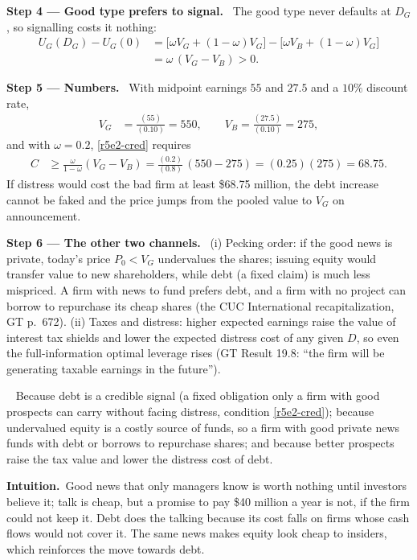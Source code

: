 \documentclass[11pt,a4paper]{article}
\newcommand{\step}[2]{\par\medskip\noindent\textbf{Step #1 --- #2.}~}
\newcommand{\intuition}{\par\medskip\noindent\textbf{Intuition.}~}
\newcommand{\answer}[1]{\par\smallskip\noindent\fbox{\textbf{Answer #1.}}~}
\begin{document}
\step{4}{Good type prefers to signal} The good type never defaults at $D_G$, so signalling costs it nothing:
\begin{align}
  U_G(D_G) - U_G(0) &= \bigl[\omega V_G + (1-\omega)V_G\bigr] - \bigl[\omega V_B + (1-\omega)V_G\bigr] \nonumber\\
  &= \omega\,(V_G - V_B) > 0. \nonumber
\end{align}

\step{5}{Numbers} With midpoint earnings $55$ and $27.5$ and a $10\%$ discount rate,
\begin{align}
  V_G &= \frac{(55)}{(0.10)} = 550, \qquad V_B = \frac{(27.5)}{(0.10)} = 275, \nonumber
\end{align}
and with $\omega=0.2$, \eqref{r5e2-cred} requires
\begin{align}
  C &\ge \frac{\omega}{1-\omega}(V_G-V_B) = \frac{(0.2)}{(0.8)}\,(550-275) = (0.25)(275) = 68.75. \nonumber
\end{align}
If distress would cost the bad firm at least \$68.75 million, the debt increase cannot be faked and the price jumps from the pooled value to $V_G$ on announcement.

\step{6}{The other two channels} (i) Pecking order: if the good news is private, today's price $P_0<V_G$ undervalues the shares; issuing equity would transfer value to new shareholders, while debt (a fixed claim) is much less mispriced. A firm with news to fund prefers debt, and a firm with no project can borrow to repurchase its cheap shares (the CUC International recapitalization, GT p.~672). (ii) Taxes and distress: higher expected earnings raise the value of interest tax shields and lower the expected distress cost of any given $D$, so even the full-information optimal leverage rises (GT Result 19.8: ``the firm will be generating taxable earnings in the future'').

\answer{\unskip} Because debt is a credible signal (a fixed obligation only a firm with good prospects can carry without facing distress, condition \eqref{r5e2-cred}); because undervalued equity is a costly source of funds, so a firm with good private news funds with debt or borrows to repurchase shares; and because better prospects raise the tax value and lower the distress cost of debt.

\intuition Good news that only managers know is worth nothing until investors believe it; talk is cheap, but a promise to pay \$40 million a year is not, if the firm could not keep it. Debt does the talking because its cost falls on firms whose cash flows would not cover it. The same news makes equity look cheap to insiders, which reinforces the move towards debt.
\end{document}

